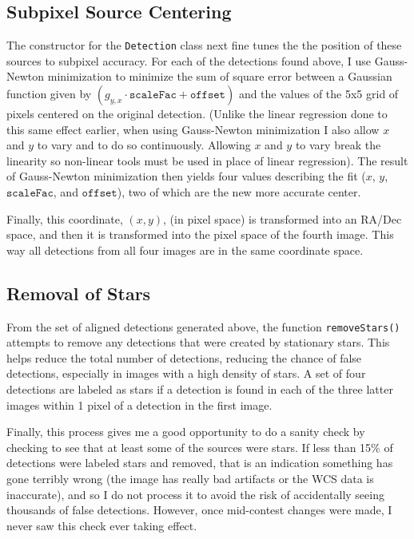\documentclass[letterpaper,options]{article}
\begin{document}
\subsection{Subpixel Source Centering}
The constructor for the \texttt{Detection} class next fine tunes the the position of these sources to subpixel accuracy. For each of the detections found above, I use Gauss-Newton minimization to minimize the sum of square error between a Gaussian function  given by $(g_{y,x}\cdot\texttt{scaleFac}+\texttt{offset})$ and the values of the 5x5 grid of pixels centered on the original detection. (Unlike the linear regression done to this same effect earlier, when using Gauss-Newton minimization I also allow $x$ and $y$ to vary and to do so continuously. Allowing $x$ and $y$ to vary break the linearity so non-linear tools must be used in place of linear regression). The result of Gauss-Newton minimization then yields four values describing the fit ($x$, $y$, $\texttt{scaleFac}$, and $\texttt{offset}$), two of which are the new more accurate center.

Finally, this coordinate, $(x,y)$, (in pixel space) is transformed into an RA/Dec space, and then it is transformed into the pixel space of the fourth image. This way all detections from all four images are in the same coordinate space.

\subsection{Removal of Stars}
From the set of aligned detections generated above, the function \texttt{removeStars()} attempts to remove any detections that were created by stationary stars. This helps reduce the total number of detections, reducing the chance of false detections, especially in images with a high density of stars. A set of four detections are labeled as stars if a detection is found in each of the three latter images within 1 pixel of a detection in the first image.

Finally, this process gives me a good opportunity to do a sanity check by checking to see that at least some of the sources were stars. If less than 15\% of detections were labeled stars and removed, that is an indication something has gone terribly wrong (the image has really bad artifacts or the WCS data is inaccurate), and so I do not process it to avoid the risk of accidentally seeing thousands of false detections. However, once mid-contest changes were made, I never saw this check ever taking effect.
\end{document}
